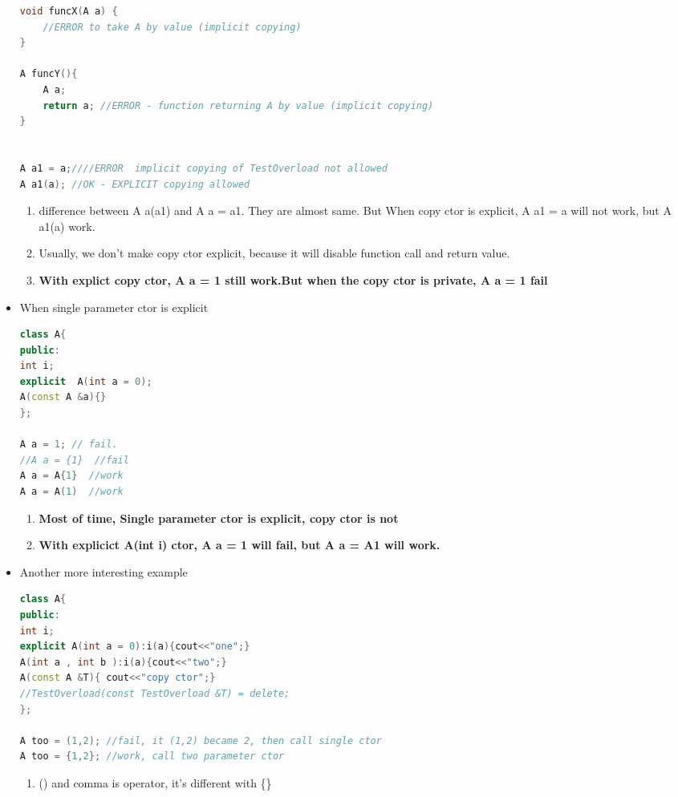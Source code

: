 \documentclass[a4paper,12pt,twoside]{book}
\begin{document}
\begin{itemize}
\begin{lstlisting}[frame=single, language=c++]
void funcX(A a) {
	//ERROR to take A by value (implicit copying)	
}
	
A funcY(){ 
	A a;
	return a; //ERROR - function returning A by value (implicit copying)
}
	

A a1 = a;////ERROR  implicit copying of TestOverload not allowed
A a1(a); //OK - EXPLICIT copying allowed
\end{lstlisting}
	
	\begin{enumerate}
		\item difference between A a(a1) and A a = a1.  They are almost same. But When copy ctor is explicit,  A a1 = a will not work, but A a1(a) work.
		
		\item Usually, we don't make copy ctor explicit, because it will disable function call and return value.
		
		\item \textbf{With explict copy ctor, A a = 1 still work.But when the copy ctor is private, A a = 1 fail}
		
		
	\end{enumerate}

\item  When single parameter ctor is explicit  
\begin{lstlisting}[frame=single, language=c++]
class A{
public:
int i;
explicit  A(int a = 0);
A(const A &a){} 
};

A a = 1; // fail. 
//A a = {1}  //fail
A a = A{1}  //work
A a = A(1)  //work
\end{lstlisting}

\begin{enumerate}
	\item  \textbf{Most of time, Single parameter ctor is explicit, copy ctor is not}
	\item \textbf{With explicict A(int i) ctor, A a = 1 will fail, but A a = A{1} will work.} 
\end{enumerate}

\item Another more interesting example 

\begin{lstlisting}[frame=single, language=c++]
class A{
public:
int i;
explicit A(int a = 0):i(a){cout<<"one";}
A(int a , int b ):i(a){cout<<"two";}
A(const A &T){ cout<<"copy ctor";} 
//TestOverload(const TestOverload &T) = delete;
};

A too = (1,2); //fail, it (1,2) became 2, then call single ctor
A too = {1,2}; //work, call two parameter ctor
\end{lstlisting}
\begin{enumerate}
	\item  () and comma is operator, it's different with \{\}
\end{enumerate}


\end{itemize}
\end{document}
